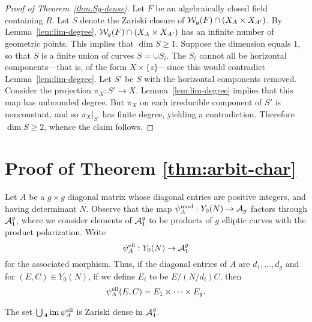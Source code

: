 \documentclass{amsart}
\begin{document}
\begin{proof}[Proof of Theorem~\ref{thm:Sg-dense}]
  Let $F$ be an algebraically closed field containing $R$. Let $S$ denote the Zariski closure of $\mathcal{W}_g(F) \cap (X_A \times X_{A'})$. By Lemma~\ref{lem:lim-degree}, $\mathcal{W}_g(F) \cap (X_A \times X_{A'})$ has an infinite number of geometric points. This implies that $\dim S \geq 1$. Suppose the dimension equals $1$, so that $S$ is a finite union of curves $S = \cup S_i$. The $S_i$ cannot all be horizontal components---that is, of the form $X \times \{z\}$---since this would contradict Lemma~\ref{lem:lim-degree}. Let $S'$ be $S$ with the horizontal components removed. Consider the projection $\pi_X: S' \to X$. Lemma~\ref{lem:lim-degree} implies that this map has unbounded degree. But $\pi_X$ on each irreducible component of $S'$ is nonconstant, and so $\pi_X|_{S'}$ has finite degree, yielding a contradiction. Therefore $\dim S \geq 2$, whence the claim follows.
\end{proof}







\section{Proof of Theorem \ref{thm:arbit-char}}
\label{sec:characteristic-p}

Let $A$ be a $g \times g$ diagonal matrix whose diagonal entries are positive integers, and having determinant $N$. Observe that the map $\psi_{A}^\mathrm{mod}: Y_0(N) \to \mathcal{A}_g$ factors through $\mathcal{A}_1^g$, where we consider elements of $\mathcal{A}_1^g$ to be products of $g$ elliptic curves with the product polarization. Write
\[
\psi_{A}^\mathrm{ell}: Y_0(N) \to \mathcal{A}_1^g
\]
for the associated morphism. Thus, if the diagonal entries of $A$ are $d_1, \ldots, d_g$ and for $(E, C) \in Y_0(N)$, if we define $E_i$ to be $E/(N/d_i)C$, then
\[
  \psi_{A}^\mathrm{ell}(E,C) = E_1 \times \cdots \times E_g.
\]

\begin{theorem}\label{thm:char-p-version}
  The set $\bigcup_A \operatorname{im}\psi_{A}^\mathrm{ell}$ is Zariski dense in $\mathcal{A}_1^g$.
\end{theorem}
\end{document}

